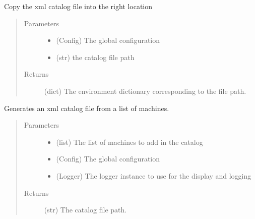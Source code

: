 \documentclass[a4paper,10pt,english]{sphinxmanual}
\begin{document}
\begin{fulllineitems}
\label{\detokenize{apidoc_commands/commands:commands.launcher.copy_catalog}}
Copy the xml catalog file into the right location
\begin{quote}\begin{description}
\item[{Parameters}] \leavevmode\begin{itemize}
\item {} 
 \textendash{} (Config) The global configuration

\item {} 
 \textendash{} (str) the catalog file path

\end{itemize}

\item[{Returns}] \leavevmode
(dict) 
The environment dictionary corresponding to the file path.

\end{description}\end{quote}

\end{fulllineitems}


\begin{fulllineitems}
\label{\detokenize{apidoc_commands/commands:commands.launcher.generate_catalog}}
Generates an xml catalog file from a list of machines.
\begin{quote}\begin{description}
\item[{Parameters}] \leavevmode\begin{itemize}
\item {} 
 \textendash{} (list) The list of machines to add in the catalog

\item {} 
 \textendash{} (Config) The global configuration

\item {} 
 \textendash{} (Logger) 
The logger instance to use for the display and logging

\end{itemize}

\item[{Returns}] \leavevmode
(str) The catalog file path.

\end{description}\end{quote}

\end{fulllineitems}
\end{document}
